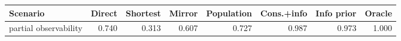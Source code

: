 \begin{tabular}{lrrrrrrr}
\toprule
Scenario & Direct & Shortest & Mirror & Population & Cons.+info & Info prior & Oracle \\
\midrule
partial observability & 0.740 & 0.313 & 0.607 & 0.727 & 0.987 & 0.973 & 1.000 \\
\bottomrule
\end{tabular}
